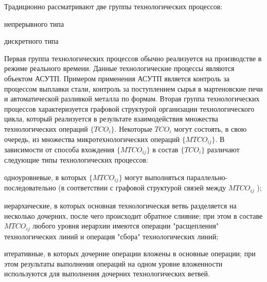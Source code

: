 \begin{SCn}
\end{SCn}



Традиционно рассматривают две группы технологических процессов:
\begin{textitemize}
	\item непрерывного типа
	\item дискретного типа
\end{textitemize}

Первая группа технологических процессов обычно реализуется на производстве в режиме реального времени. Данные технологические процессы являются объектом АСУТП. Примером применения АСУТП является контроль за процессом выплавки стали, контроль за поступлением сырья в мартеновские печи и автоматической разливкой металла по формам. Вторая группа технологических процессов характеризуется графовой структурой организации технологического цикла, который реализуется в результате взаимодействия множества технологических операций $\big\{TCO_i\big\}$. Некоторые $TCO_i$ могут состоять, в свою очередь, из множества микротехнологических операций $\big\{MTCO_{ij}\big\}$.
В зависимости от способа вхождения $\big\{MTCO_{ij}\big\}$  в состав $\big\{TCO_i\big\}$ различают следующие типы технологических процессов:

\begin{textitemize}
	\item одноуровневые, в которых $\big\{MTCO_{ij}\big\}$ могут выполняться параллельно-последовательно (в соответствии с графовой структурой связей между $MTCO_{ij}$ );
	\item иерархические, в которых основная технологическая ветвь разделяется на несколько дочерних, после чего происходит обратное слияние; при этом в составе $MTCO_{ij}$ любого уровня иерархии имеются операции "расщепления"{} технологических линий и операция "сбора"{} технологических линий;
    \item итеративные, в которых дочерние операции вложены в основные операции; при этом результаты выполнения операций на одном уровне вложенности используются для выполнения дочерних технологических ветвей.
\end{textitemize}

